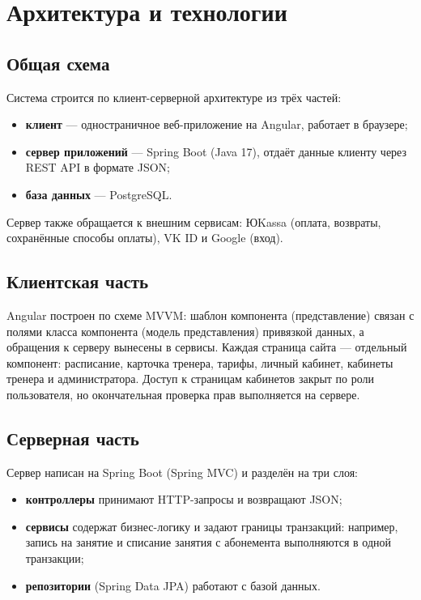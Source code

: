 \documentclass[14pt,a4paper]{extarticle}
\begin{document}
\sloppy
\section{Архитектура и технологии}

\subsection{Общая схема}

Система строится по клиент-серверной архитектуре из трёх частей:
\begin{itemize}
  \item \textbf{клиент} --- одностраничное веб-приложение на Angular, работает в браузере;
  \item \textbf{сервер приложений} --- Spring Boot (Java 17), отдаёт данные клиенту через REST API в формате JSON;
  \item \textbf{база данных} --- PostgreSQL.
\end{itemize}

Сервер также обращается к внешним сервисам: ЮKassa (оплата, возвраты, сохранённые способы оплаты), VK ID и Google (вход).

\subsection{Клиентская часть}

Angular построен по схеме MVVM: шаблон компонента (представление) связан с полями класса компонента (модель представления) привязкой данных, а обращения к серверу вынесены в сервисы. Каждая страница сайта --- отдельный компонент: расписание, карточка тренера, тарифы, личный кабинет, кабинеты тренера и администратора. Доступ к страницам кабинетов закрыт по роли пользователя, но окончательная проверка прав выполняется на сервере.

\subsection{Серверная часть}

Сервер написан на Spring Boot (Spring MVC) и разделён на три слоя:
\begin{itemize}
  \item \textbf{контроллеры} принимают HTTP-запросы и возвращают JSON;
  \item \textbf{сервисы} содержат бизнес-логику и задают границы транзакций: например, запись на занятие и списание занятия с абонемента выполняются в одной транзакции;
  \item \textbf{репозитории} (Spring Data JPA) работают с базой данных.
\end{itemize}
\end{document}
